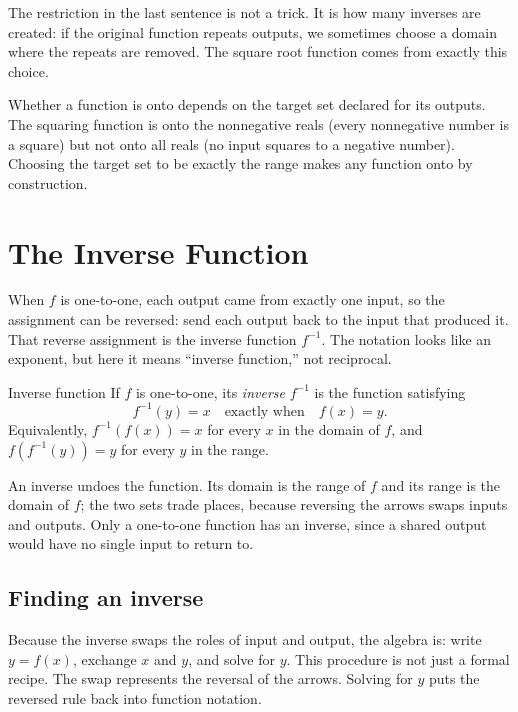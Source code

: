 \documentclass[12pt]{book}
\begin{document}
The restriction in the last sentence is not a trick. It is how many inverses are created:
if the original function repeats outputs, we sometimes choose a domain where the repeats
are removed. The square root function comes from exactly this choice.

Whether a function is onto depends on the target set declared for its outputs. The
squaring function is onto the nonnegative reals (every nonnegative number is a square)
but not onto all reals (no input squares to a negative number). Choosing the target set
to be exactly the range makes any function onto by construction.

\newpage
\section{The Inverse Function}

When $f$ is one-to-one, each output came from exactly one input, so the assignment can be
reversed: send each output back to the input that produced it. That reverse assignment
is the inverse function $f^{-1}$. The notation looks like an exponent, but here it means
``inverse function,'' not reciprocal.

\begin{definition}{Inverse function}
If $f$ is one-to-one, its \emph{inverse} $f^{-1}$ is the function satisfying
\[
f^{-1}(y)=x \quad\text{exactly when}\quad f(x)=y.
\]
Equivalently, $f^{-1}(f(x))=x$ for every $x$ in the domain of $f$, and
$f(f^{-1}(y))=y$ for every $y$ in the range.
\end{definition}

\begin{keyidea}
An inverse undoes the function. Its domain is the range of $f$ and its range is the
domain of $f$; the two sets trade places, because reversing the arrows swaps inputs
and outputs. Only a one-to-one function has an inverse, since a shared output would
have no single input to return to.
\end{keyidea}

\subsection{Finding an inverse}

Because the inverse swaps the roles of input and output, the algebra is: write
$y=f(x)$, exchange $x$ and $y$, and solve for $y$. This procedure is not just a formal
recipe. The swap represents the reversal of the arrows. Solving for $y$ puts the
reversed rule back into function notation.
\end{document}
